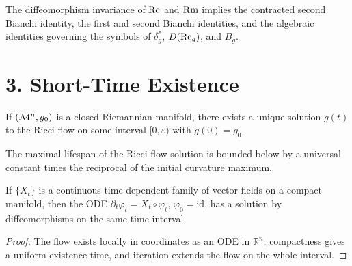 \begin{remark}
\label{ch03-rem-symbol-of-composition}
The diffeomorphism invariance of \(\operatorname{Rc}\) and \(\operatorname{Rm}\) implies the contracted second Bianchi identity, the first and second Bianchi identities, and the algebraic identities governing the symbols of \(\delta_g^*\), \(D(\operatorname{Rc}_g)\), and \(B_g\).
\end{remark}

\section*{3. Short-Time Existence}

\begin{theorem}
\label{ch03-thm-short-time-existence}
If \((\mathcal{M}^n,g_0)\) is a closed Riemannian manifold, there exists a unique solution \(g(t)\) to the Ricci flow on some interval \([0,\varepsilon)\) with \(g(0)=g_0\).
\end{theorem}

\begin{remark}
\label{ch03-rem-lifetime-lower-bound}
The maximal lifespan of the Ricci flow solution is bounded below by a universal constant times the reciprocal of the initial curvature maximum.
\end{remark}

\begin{lemma}
\label{ch03-lem-deTurck-flow-diffeomorphisms}
If \(\{X_t\}\) is a continuous time-dependent family of vector fields on a compact manifold, then the ODE \(\partial_t\varphi_t=X_t\circ\varphi_t\), \(\varphi_0=\mathrm{id}\), has a solution by diffeomorphisms on the same time interval.
\end{lemma}

\begin{proof}
The flow exists locally in coordinates as an ODE in \(\mathbb R^n\); compactness gives a uniform existence time, and iteration extends the flow on the whole interval.
\end{proof}

